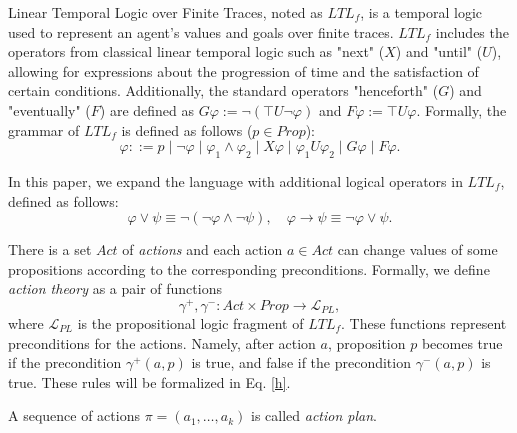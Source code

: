 \documentclass[a4paper,fleqn]{cas-dc}
\begin{document}
Linear Temporal Logic over Finite Traces, noted as \( LTL_{f} \), is a temporal logic used to represent an agent's values and goals over finite traces. \( LTL_{f} \) includes the operators from classical linear temporal logic such as "next" (\( X \)) and "until" (\( U \)), allowing for expressions about the progression of time and the satisfaction of certain conditions. Additionally, the standard operators "henceforth" (\( G \)) and "eventually" (\( F \)) are defined as \( G\varphi := \neg(\top U \neg \varphi) \) and \( F\varphi := \top U \varphi \). Formally, the grammar of \( LTL_{f} \) is defined as follows ($p\in Prop$):
\begin{equation}
    \varphi ::= p \mid \neg \varphi \mid \varphi_1 \land \varphi_2 \mid X \varphi \mid \varphi_1 U \varphi_2 \mid G \varphi \mid F \varphi.
\end{equation}

In this paper, we expand the language with additional logical operators in $LTL_f$, defined as follows:
\begin{equation}
\varphi \lor \psi \equiv \neg(\neg \varphi \land \neg \psi), \quad
\varphi \to \psi \equiv \neg \varphi \lor \psi.
\end{equation}

There is a set $Act$ of {\it actions} and each action $a\in Act$ can change values of some propositions
according to the corresponding preconditions. Formally, we define {\it action theory} as a pair of functions
\begin{equation}\gamma^+, \gamma^- : Act \times Prop \to \mathcal{L}_{PL},\end{equation}
where $\mathcal{L}_{PL}$ is the propositional logic fragment of $LTL_f$.
These functions represent preconditions for the actions. Namely,
after action $a$, proposition $p$ becomes true if the precondition $\gamma^+(a, p)$ is true,
and false if the precondition $\gamma^-(a, p)$ is true. These rules will be formalized in Eq. \eqref{h}.

A sequence of actions $\pi = (a_1, \dots, a_k)$ is called {\it action plan}.
\end{document}
